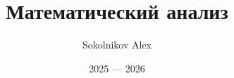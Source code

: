 

\title{\Huge Математический анализ}
\author{\huge Sokolnikov Alex}
\date{\LARGE 2025 --- 2026}


    \pagestyle{fancy}
    \maketitle
    \tableofcontents
    \newpage



